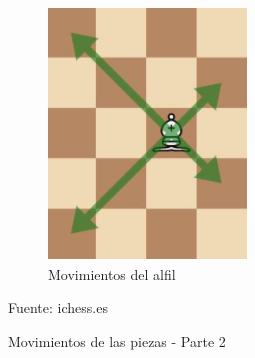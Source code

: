 \documentclass[conference]{IEEEtran}
\begin{document}
\begin{figure}[h!]
\begin{subfigure}[b]{0.445\linewidth}
    \includegraphics[width=\linewidth]{images/Capturep04.PNG}
    \caption{Movimientos del alfil}
    \label{fig:alfilM}
    \end{subfigure}
    \caption{Movimientos de las piezas - Parte 2}
    {{\footnotesize Fuente: ichess.es}}
    \label{fig:westminster}
    \end{figure}
    
\end{document}
